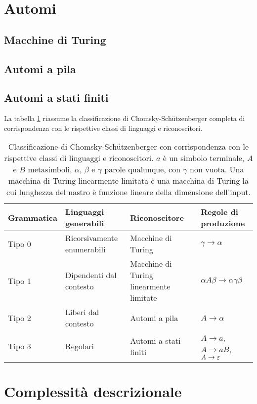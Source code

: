 \section{Automi}


\subsection{Macchine di Turing}


\subsection{Automi a pila}


\subsection{Automi a stati finiti}

La tabella \ref{tab:prel:chomskyhier} riassume la classificazione di Chomsky-Schützenberger completa di corrispondenza con le rispettive classi di linguaggi e riconoscitori.

\begin{table}
	\caption{Classificazione di Chomsky-Schützenberger con corrispondenza con le rispettive classi di linguaggi e riconoscitori. $a$ è un simbolo terminale, $A$ e $B$ metasimboli, $\alpha$, $\beta$ e $\gamma$ parole qualunque, con $\gamma$ non vuota. Una macchina di Turing linearmente limitata è una macchina di Turing la cui lunghezza del nastro è funzione lineare della dimensione dell'input.}
	\label{tab:prel:chomskyhier}
	\centering
	\begin{tabularx}{\textwidth}{lXXl}
		\toprule
		\textbf{Grammatica} & \textbf{Linguaggi generabili} & \textbf{Riconoscitore}                  & \textbf{Regole di produzione}         \\
		\midrule
		Tipo 0              & Ricorsivamente enumerabili    & Macchine di Turing                      & $\gamma\to\alpha$                     \\
		Tipo 1              & Dipendenti dal contesto       & Macchine di Turing linearmente limitate & $\alpha A\beta\to\alpha\gamma\beta$   \\
		Tipo 2              & Liberi dal contesto           & Automi a pila                           & $A\to\alpha$                          \\
		Tipo 3              & Regolari                      & Automi a stati finiti                   & $A\to a$, $A\to aB$, $A\to\varepsilon$ \\
		\bottomrule
	\end{tabularx}
\end{table}



\section{Complessità descrizionale}
